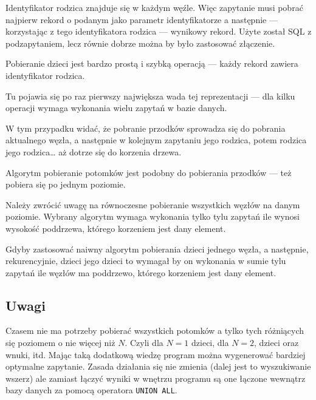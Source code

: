 
Identyfikator rodzica znajduje się w każdym węźle.
Więc zapytanie musi pobrać najpierw rekord o podanym jako parametr identyfikatorze a następnie
--- korzystając z tego identyfikatora rodzica --- wynikowy rekord.
Użyte został SQL z podzapytaniem, lecz równie dobrze można by było zastosować złączenie. 




Pobieranie dzieci jest bardzo prostą i szybką operacją
--- każdy rekord zawiera identyfikator rodzica.



Tu pojawia się po raz pierwszy największa wada tej reprezentacji --- 
dla kilku operacji wymaga wykonania wielu zapytań w bazie danych.

W tym przypadku widać, że pobranie przodków sprowadza się do pobrania aktualnego węzła,
a następnie w kolejnym zapytaniu jego rodzica,
potem rodzica jego rodzica\ldots
aż dotrze się do korzenia drzewa.





Algorytm pobieranie potomków jest podobny do pobierania przodków --- też pobiera się po jednym poziomie.


Należy zwrócić uwagę na równoczesne pobieranie wszystkich węzłów na danym poziomie.
Wybrany algorytm wymaga wykonania tylko tylu zapytań ile wynosi wysokość poddrzewa,
którego korzeniem jest dany element.


Gdyby zastosować naiwny algorytm pobierania dzieci jednego węzła,
a następnie, rekurencyjnie, dzieci jego dzieci
to wymagał by on wykonania w sumie tylu zapytań ile węzłów ma poddrzewo,
którego korzeniem jest dany element.


\subsection{Uwagi}

Czasem nie ma potrzeby pobierać wszystkich potomków a tylko tych różniących się poziomem o nie więcej niż $N$.
Czyli dla $N = 1$ dzieci, dla $N = 2$, dzieci oraz wnuki, itd.
Mając taką dodatkową wiedzę program można wygenerować bardziej optymalne zapytanie.
Zasada działania się nie zmienia (dalej jest to wyszukiwanie wszerz)
ale zamiast łączyć wyniki w wnętrzu programu są one łączone wewnątrz bazy danych za pomocą operatora \texttt{UNION ALL}.

